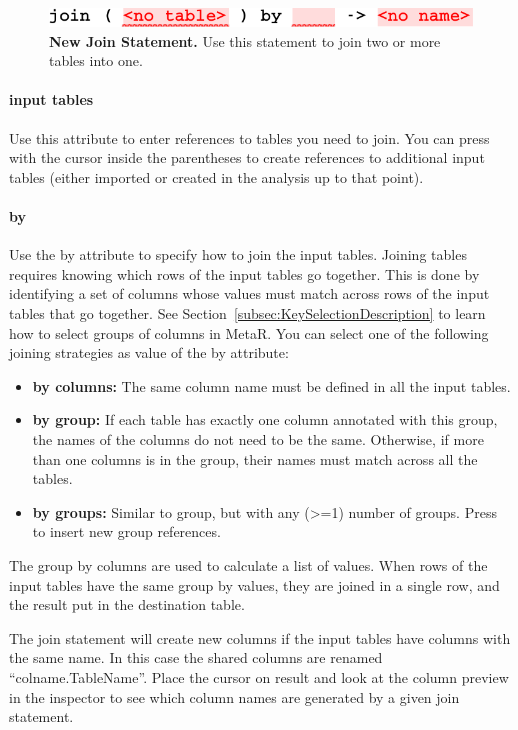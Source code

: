 \begin{figure}
  \centering
  \includegraphics[width=\figWidthNarrow]{figures/NewJoinStatement.pdf}
\caption[New Join Statement.]{\textbf{New Join Statement.} Use this statement to join two or more tables into one.}
\label{fig:NewJoinStatement}
\end{figure}

\paragraph{input tables}
Use this attribute to enter references to tables you need to join. You can press \keys{\return} with the cursor inside the parentheses to create references to additional input tables (either imported or created in the analysis up to that point).
\paragraph{by}
Use the by attribute to specify how to join the input tables. Joining tables requires knowing which rows of the input tables go together. This is done by identifying a set of columns whose values must match across rows of the input tables that go together. See Section~\ref{subsec:KeySelectionDescription} to learn how to select groups of columns in MetaR. You can select one of the following joining strategies as value of the by attribute:

\begin{itemize}
	\item \textbf{by columns:} The same column name must be defined in all the input tables.
	\item \textbf{by group:} If each table has exactly one column annotated with this group, the names of the columns do not need to be the same. Otherwise, if more than one columns is in the group, their names must match across all the tables. 
	\item \textbf{by groups:} Similar to group, but with any (>=1) number of groups. Press \keys{\return} to insert new group references.
\end{itemize}
 The group by columns are used to calculate a list of values. When rows of the input tables have the same group by values, they are joined in a single row, and the result put in the destination table. 

\begin{remark}
The join statement will create new columns if the input tables have columns with the same name. In this case the shared columns are renamed ``colname.TableName''. Place the cursor on result and look at the column preview in the inspector to see which column names are generated by a given join statement.
\end{remark}

